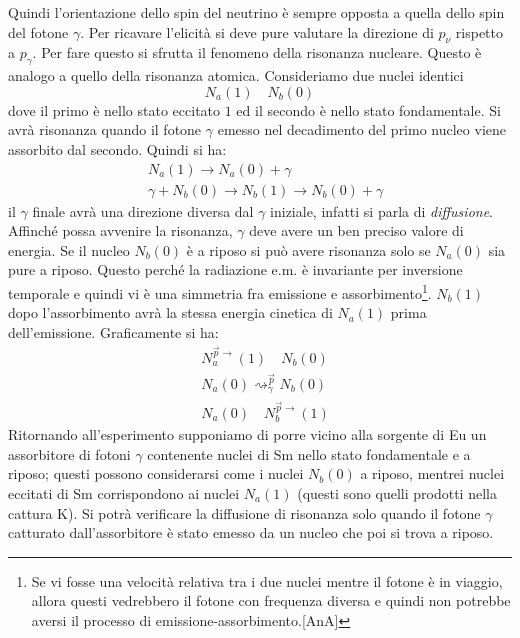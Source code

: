 Quindi l'orientazione dello spin del neutrino è sempre opposta a quella dello spin del fotone $\gamma$. Per ricavare l'elicità si deve pure valutare
la direzione di $p_{\nu}$ rispetto a $p_{\gamma}$. Per fare questo si sfrutta il fenomeno della risonanza nucleare. Questo è analogo a quello della risonanza atomica.
Consideriamo due nuclei identici
\[
N_a(1)\quad N_b(0)
\]
dove il primo è nello stato eccitato $1$ ed il secondo è nello stato fondamentale. Si avrà risonanza quando il fotone $\gamma$ emesso nel decadimento
del primo nucleo viene assorbito dal secondo. Quindi si ha:
\begin{align*}
&N_a(1)\rightarrow N_a(0)+\gamma\\
&\gamma+N_b(0)\rightarrow N_b(1)\rightarrow N_b(0)+\gamma
\end{align*}
il $\gamma$ finale avrà una direzione diversa dal $\gamma$ iniziale, infatti si parla di \textit{diffusione}. Affinché possa avvenire la risonanza,
$\gamma$ deve avere un ben preciso valore di energia. Se il nucleo $N_b(0)$ è a riposo si può avere risonanza solo se $N_a(0)$ sia pure a riposo.
Questo perché la radiazione e.m. è invariante per inversione temporale e quindi vi è una simmetria fra emissione e assorbimento\footnote{Se vi fosse una velocità relativa
tra i due nuclei mentre il fotone è in viaggio, allora questi vedrebbero il fotone con frequenza diversa e quindi non potrebbe aversi il processo di emissione-assorbimento.[AnA]}.
$N_b(1)$ dopo l'assorbimento avrà la stessa energia cinetica di $N_a(1)$ prima dell'emissione. Graficamente si ha:
\begin{align*}
&N_a^{\vec{p}\rightarrow}(1)\quad N_b(0)\\
&N_a(0)\rightsquigarrow_{\gamma}^{\vec{p}}N_b(0)\\
&N_a(0)\quad N_b^{\vec{p}\rightarrow}(1)
\end{align*}
Ritornando all'esperimento supponiamo di porre vicino alla sorgente di Eu un assorbitore di fotoni $\gamma$ contenente nuclei di Sm nello stato fondamentale e a riposo;
questi possono considerarsi come i nuclei $N_b(0)$ a riposo, mentrei nuclei eccitati di Sm corrispondono ai nuclei $N_a(1)$ (questi sono quelli prodotti nella cattura K).
Si potrà verificare la diffusione di risonanza solo quando il fotone $\gamma$ catturato dall'assorbitore è stato emesso da un nucleo che poi si trova a riposo.

